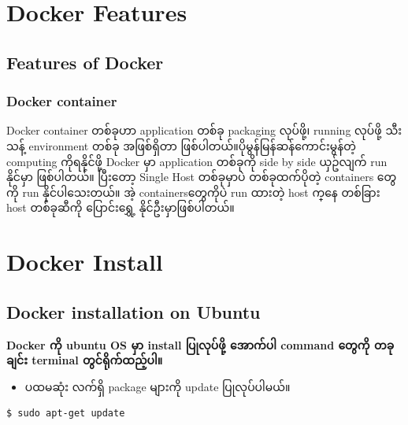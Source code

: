 \documentclass[]{article}
\providecommand{\tightlist}{%
  \setlength{\itemsep}{0pt}\setlength{\parskip}{0pt}}
\begin{document}
\pagebreak

\hypertarget{docker-features}{%
\section{Docker Features}\label{docker-features}}

\hypertarget{features-of-docker}{%
\subsection{Features of Docker}\label{features-of-docker}}

\hypertarget{docker-container}{%
\subsubsection{Docker container}\label{docker-container}}

Docker container တစ်ခုဟာ application တစ်ခု packaging လုပ်ဖို့၊ running
လုပ်ဖို့ သီးသန့် environment တစ်ခု အဖြစ်​ရှိ​တာ
ဖြစ်ပါတယ်။ပိုမွန်​မြန်ဆန်​ကောင်းမွန်တဲ့ computing ကိုရနိုင်ဖို့ Docker
မှာ application တစ်ခုကို side by side ယှဥ်လျက် run နိုင်မှာ ဖြစ်ပါတယ်။
ပြီး​တော့ Single Host တစ်ခုမှာပဲ တစ်ခုထက်ပိုတဲ့ containers ​တွေကို run
နိုင်ပါ​သေးတယ်။ အဲ့ containers ​တွေကိုပဲ run ထားတဲ့ host က္​နေ တစ်ခြား
host တစ်ခုဆီကို ​ပြောင်း​​ရွှေ့ နိုင်ဦးမှာဖြစ်ပါတယ်။

\pagebreak

\hypertarget{docker-install}{%
\section{Docker Install}\label{docker-install}}

\hypertarget{docker-installation-on-ubuntu}{%
\subsection{Docker installation on
Ubuntu}\label{docker-installation-on-ubuntu}}

\textbf{Docker ကို ubuntu OS မှာ install ပြုလုပ်ဖို့ အောက်ပါ command
တွေကို တခုချင်း terminal တွင်ရိုက်ထည့်ပါ။}

\begin{itemize}
\tightlist
\item
  ပထမဆုံး လက်ရှိ package များကို update ပြုလုပ်ပါမယ်။
\end{itemize}

\begin{verbatim}
$ sudo apt-get update
\end{verbatim}
\end{document}
